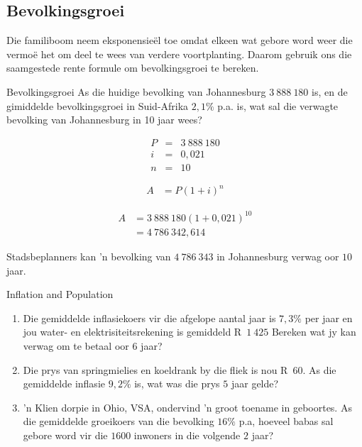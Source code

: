 \subsection{Bevolkingsgroei}

 Die familiboom neem eksponensie\"el toe omdat elkeen wat gebore word weer die vermo\"e het om deel te wees van verdere voortplanting. Daarom gebruik ons die saamgestede rente formule om bevolkingsgroei te bereken.


\begin{wex}{Bevolkingsgroei}
    {As die huidige bevolking van Johannesburg $3~888~180$ is, en de gimiddelde bevolkingsgroei in Suid-Afrika $2,1\%$ p.a. is, wat sal die verwagte bevolking van Johannesburg in 10 jaar wees?}{
    
    \begin{eqnarray*}
	P &=& 3~888~180\\
	i &=& 0,021\\
	n &=& 10
    \end{eqnarray*}

    \begin{align*}
	A &= P(1 + i)^n
    \end{align*}

    \begin{align*}
	A &= 3~888~180(1 + 0,021)^{10}\\
	  &= 4~786~342,614
    \end{align*}

    Stadsbeplanners kan 'n bevolking van $4~786~343$ in Johannesburg verwag oor $10$ jaar.
    }
\end{wex}


\begin{exercises}{Inflation and Population}
{
    \begin{enumerate}[label=\textbf{\arabic*}.]
	\item Die gemiddelde inflasiekoers vir die afgelope aantal jaar is $7,3\%$ per jaar en jou water- en elektrisiteitsrekening is gemiddeld R~$1~425$ Bereken wat jy kan verwag om te betaal oor 6 jaar?

	\item Die prys van springmielies en koeldrank by die fliek is nou R~$60$. As die gemiddelde inflasie $9,2\%$ is, wat was die prys $5$ jaar gelde?

	\item 'n Klien dorpie in Ohio, VSA, ondervind 'n groot toename in geboortes. As die gemiddelde groeikoers van die bevolking $16\%$ p.a, hoeveel babas sal gebore word vir die $1600$ inwoners in die volgende $2$ jaar?
    \end{enumerate}

}
\end{exercises}



